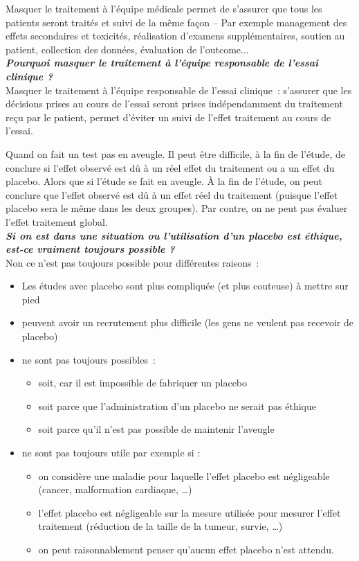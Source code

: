 Masquer le traitement à l’équipe médicale  permet de s’assurer que tous les patients seront traités et suivi de la même façon
– Par exemple management des effets secondaires et toxicités, réalisation
d’examens supplémentaires, soutien au patient, collection des
données, évaluation de l’outcome...\\

\textbf{\textit{Pourquoi masquer le traitement à l’équipe responsable de l’essai clinique ?}}\\
Masquer le traitement à l’équipe responsable de l’essai clinique : s’assurer que les décisions prises au cours de l’essai seront prises indépendamment du traitement reçu par le patient, permet d’éviter un suivi de l’effet traitement au cours de l'essai.

Quand on fait un test pas en aveugle. Il peut être difficile, à la fin de l’étude, de conclure si l’effet observé est dû à un réel effet du traitement ou a un effet du placebo. Alors que si l'étude se fait en aveugle. À la fin de l’étude, on peut conclure que  l’effet observé est dû à un effet réel du traitement (puisque l’effet placebo sera le même dans les deux groupes). Par contre, on ne peut pas évaluer l’effet traitement global.\\

\textbf{\textit{Si on est dans une situation ou l’utilisation d’un placebo est éthique, est-ce vraiment toujours possible ?}}\\

Non ce n'est pas toujours possible pour différentes raisons :
\begin{itemize}
    \item Les études avec placebo sont plus compliquée (et plus couteuse) à mettre sur pied
 \item peuvent avoir un recrutement plus difficile (les gens ne veulent pas recevoir de placebo)
 \item ne sont pas toujours possibles :
 \begin{itemize}
     \item soit, car il est impossible de fabriquer un placebo
\item soit parce que l’administration d’un placebo ne serait pas 
éthique
\item soit parce qu’il n’est pas possible de maintenir l’aveugle
 \end{itemize}
 \item ne sont pas toujours utile par exemple si : 
 \begin{itemize}
     \item on considère une maladie pour laquelle l’effet placebo est 
négligeable (cancer, malformation cardiaque, …)
\item l’effet placebo est négligeable sur la mesure utilisée pour 
mesurer l’effet traitement (réduction de la taille de la tumeur, 
survie, …)
\item on peut raisonnablement penser qu’aucun effet placebo n’est 
attendu.
 \end{itemize}
\end{itemize}
\vspace{0.15cm}

